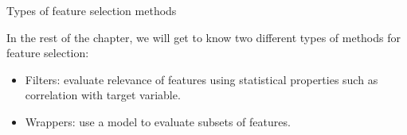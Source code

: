 \documentclass[11pt,compress,t,notes=noshow, xcolor=table]{beamer}
\begin{document}
  \begin{vbframe}{Types of feature selection methods}
 
  In the rest of the chapter, we will get to know two different types of methods for feature selection:

  \lz

  \begin{itemize}
    \item Filters: evaluate relevance of features using statistical properties such as correlation with target variable.
    \item Wrappers: use a model to evaluate subsets of features. 
  \end{itemize}


 


  \end{vbframe}
\end{document}
